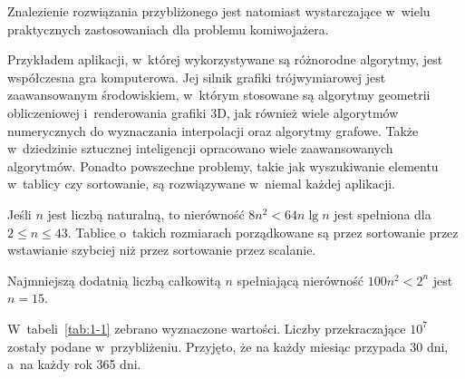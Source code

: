 Znalezienie rozwiązania przybliżonego jest natomiast wystarczające w~wielu praktycznych zastosowaniach dla problemu komiwojażera.


\exercise %
Przykładem aplikacji, w~której wykorzystywane są różnorodne algorytmy, jest współczesna gra komputerowa. Jej silnik grafiki trójwymiarowej jest zaawansowanym środowiskiem, w~którym stosowane są algorytmy geometrii obliczeniowej i~renderowania grafiki 3D, jak również wiele algorytmów numerycznych do wyznaczania interpolacji oraz algorytmy grafowe. Także w~dziedzinie sztucznej inteligencji opracowano wiele zaawansowanych algorytmów. Ponadto powszechne problemy, takie jak wyszukiwanie elementu w~tablicy czy sortowanie, są rozwiązywane w~niemal każdej aplikacji.

\exercise %
Jeśli $n$ jest liczbą naturalną, to nierówność $8n^2<64n\lg n$ jest spełniona dla $2\le n\le43$. Tablice o~takich rozmiarach porządkowane są przez sortowanie przez wstawianie szybciej niż przez sortowanie przez scalanie.

\exercise %
Najmniejszą dodatnią liczbą całkowitą $n$ spełniającą nierówność $100n^2<2^n$ jest $n=15$.

\problems

W~tabeli~\ref{tab:1-1} zebrano wyznaczone wartości. Liczby przekraczające $10^7$ zostały podane w~przybliżeniu. Przyjęto, że na każdy miesiąc przypada 30 dni, a~na każdy rok 365 dni.

